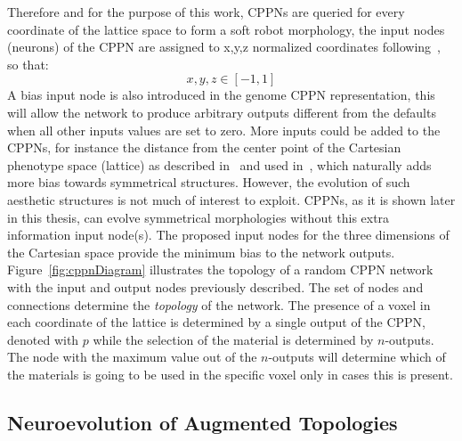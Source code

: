 \documentclass{sig-alternate}
\begin{document}
Therefore and for the purpose of this work, CPPNs are queried for every coordinate of the lattice space to form a soft robot morphology, the input nodes (neurons) of the CPPN are assigned to x,y,z normalized coordinates following~\cite{cheney2013unshackling}, so that:
\[x,y,z \in [-1,1]\]
A bias input node is also introduced in the genome CPPN representation, this will allow the network to produce arbitrary outputs different from the defaults when all other inputs values are set to zero. More inputs could be added to the CPPNs, for instance the distance from the center point of the Cartesian phenotype space (lattice) as described in~\cite{stanley2007compositional} and used in~\cite{cheney2013unshackling}, which naturally adds more bias towards symmetrical structures. However, the evolution of such aesthetic structures is not much of interest to exploit. CPPNs, as it is shown later in this thesis, can evolve symmetrical morphologies without this extra information input node(s). The proposed input nodes for the three dimensions of the Cartesian space provide the minimum bias to the network outputs. Figure~\ref{fig:cppnDiagram} illustrates the topology of a random CPPN network with the input and output nodes previously described. The set of nodes and connections determine the \emph{topology} of the network. The presence of a voxel in each coordinate of the lattice is determined by a single output of the CPPN, denoted with $p$ while the selection of the material is determined by $n$-outputs. The node with the maximum value out of the $n$-outputs will determine which of the materials is going to be used in the specific voxel only in cases this is present.


\subsection{Neuroevolution of Augmented Topologies}
\end{document}

